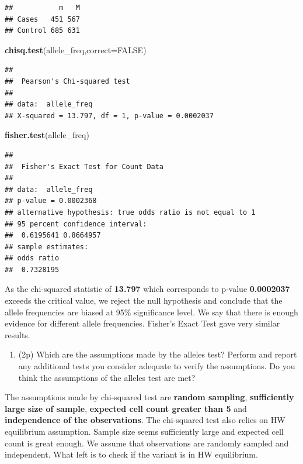 \documentclass[
]{article}
\newenvironment{Shaded}{\begin{snugshade}}{\end{snugshade}}
\newcommand{\DataTypeTok}[1]{\textcolor[rgb]{0.13,0.29,0.53}{#1}}
\newcommand{\KeywordTok}[1]{\textcolor[rgb]{0.13,0.29,0.53}{\textbf{#1}}}
\newcommand{\NormalTok}[1]{#1}
\newcommand{\OtherTok}[1]{\textcolor[rgb]{0.56,0.35,0.01}{#1}}
\providecommand{\tightlist}{%
  \setlength{\itemsep}{0pt}\setlength{\parskip}{0pt}}
\begin{document}
\begin{verbatim}
##           m   M
## Cases   451 567
## Control 685 631
\end{verbatim}

\begin{Shaded}
\begin{Highlighting}[]
\KeywordTok{chisq.test}\NormalTok{(allele_freq,}\DataTypeTok{correct=}\OtherTok{FALSE}\NormalTok{)}
\end{Highlighting}
\end{Shaded}

\begin{verbatim}
## 
##  Pearson's Chi-squared test
## 
## data:  allele_freq
## X-squared = 13.797, df = 1, p-value = 0.0002037
\end{verbatim}

\begin{Shaded}
\begin{Highlighting}[]
\KeywordTok{fisher.test}\NormalTok{(allele_freq)}
\end{Highlighting}
\end{Shaded}

\begin{verbatim}
## 
##  Fisher's Exact Test for Count Data
## 
## data:  allele_freq
## p-value = 0.0002368
## alternative hypothesis: true odds ratio is not equal to 1
## 95 percent confidence interval:
##  0.6195641 0.8664957
## sample estimates:
## odds ratio 
##  0.7328195
\end{verbatim}

As the chi-squared statistic of \textbf{13.797} which corresponds to
p-value \textbf{0.0002037} exceeds the critical value, we reject the
null hypothesis and conclude that the allele frequencies are biased at
95\% significance level. We say that there is enough evidence for
different allele frequencies. Fisher's Exact Test gave very similar
results.

\begin{enumerate}
\def\labelenumi{\arabic{enumi}.}
\setcounter{enumi}{3}
\tightlist
\item
  (2p) Which are the assumptions made by the alleles test? Perform and
  report any additional tests you consider adequate to verify the
  assumptions. Do you think the assumptions of the alleles test are met?
\end{enumerate}

The assumptions made by chi-squared test are \textbf{random sampling},
\textbf{sufficiently large size of sample}, \textbf{expected cell count
greater than 5} and \textbf{independence of the observations}. The
chi-squared test also relies on HW equilibrium assumption. Sample size
seems sufficiently large and expected cell count is great enough. We
assume that observations are randomly sampled and independent. What left
is to check if the variant is in HW equilibrium.
\end{document}
